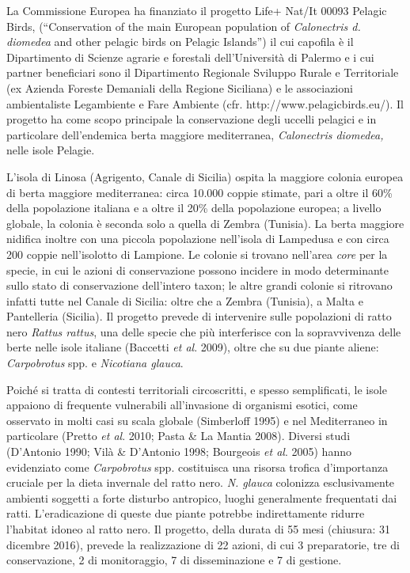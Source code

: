 \vspace{1cm}
La Commissione Europea ha finanziato il progetto Life+ Nat/It 00093
{\textquotedbl}Pelagic Birds{\textquotedbl},
({\textquotedblleft}Conservation of the main European population of
\textit{Calonectris d. diomedea} and other pelagic birds on Pelagic
Islands{\textquotedblright})\textbf{ }il cui capofila \`e il
Dipartimento di Scienze agrarie e forestali
dell'Universit\`a di Palermo e i cui partner
beneficiari sono il Dipartimento Regionale Sviluppo Rurale e
Territoriale (ex Azienda Foreste Demaniali della Regione Siciliana) e
le associazioni ambientaliste Legambiente e Fare Ambiente (cfr.
http://www.pelagicbirds.eu/). Il progetto ha come scopo principale la
conservazione degli uccelli pelagici e in particolare
dell{\textquoteright}endemica berta maggiore mediterranea,
\textit{Calonectris diomedea,} nelle isole Pelagie.

L'isola di Linosa (Agrigento, Canale di Sicilia) ospita
la maggiore colonia europea di berta maggiore mediterranea: circa
10.000 coppie stimate, pari a oltre il 60\% della popolazione italiana
e a oltre il 20\% della popolazione europea; a livello globale, la
colonia \`e seconda solo a quella di Zembra (Tunisia). La berta
maggiore nidifica inoltre con una piccola popolazione
nell'isola di Lampedusa e con circa 200 coppie
nell'isolotto di Lampione. Le colonie si trovano
nell'area \textit{core} per la specie, in cui le
azioni di conservazione possono incidere in modo determinante sullo
stato di conservazione dell'intero taxon; le altre
grandi colonie si ritrovano infatti tutte nel Canale di Sicilia: oltre
che a Zembra (Tunisia), a Malta e Pantelleria (Sicilia). Il progetto
prevede di intervenire sulle popolazioni di ratto nero \textit{Rattus
rattus}, una delle specie che pi\`u interferisce con la sopravvivenza
delle berte nelle isole italiane (Baccetti \textit{et al}. 2009), oltre
che su due piante aliene: \textit{Carpobrotus} spp. e \textit{Nicotiana
glauca}.

Poich\'e si tratta di contesti territoriali circoscritti, e spesso
semplificati, le isole appaiono di frequente vulnerabili
all{\textquoteright}invasione di organismi esotici, come osservato in
molti casi su scala globale (Simberloff 1995) e nel Mediterraneo in
particolare (Pretto \textit{et al}. 2010; Pasta \& La Mantia 2008). 
Diversi studi (D{\textquoteright}Antonio 1990; Vil\`a \&
D{\textquoteright}Antonio 1998; Bourgeois \textit{et al}. 2005) hanno
evidenziato come \textit{Carpobrotus} spp. costituisca una risorsa
trofica d{\textquoteright}importanza cruciale per la dieta invernale
del ratto nero. \textit{N. glauca} colonizza esclusivamente ambienti
soggetti a forte disturbo antropico, luoghi generalmente frequentati
dai ratti. L{\textquoteright}eradicazione di queste due piante potrebbe
indirettamente ridurre l{\textquoteright}habitat idoneo al ratto nero.
Il progetto, della durata di 55 mesi (chiusura: 31 dicembre 2016),
prevede la realizzazione di 22 azioni, di cui 3 preparatorie, tre di
conservazione, 2 di monitoraggio, 7 di disseminazione e 7 di gestione.

